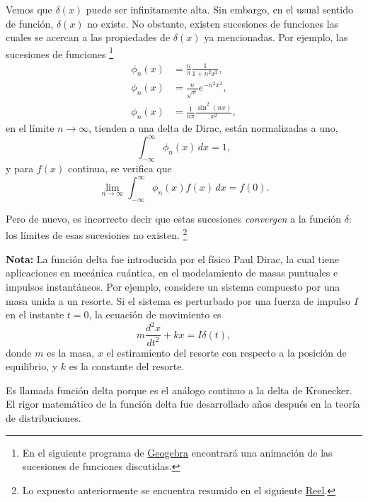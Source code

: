 Vemos que $\delta(x)$ puede ser infinitamente alta. Sin embargo, en el usual sentido de función, $\delta(x)$ no existe. No obstante, existen sucesiones de funciones las cuales se acercan a las propiedades de $\delta(x)$ ya mencionadas. Por ejemplo, las sucesiones de funciones \footnote{En el siguiente programa de \href{https://www.geogebra.org/m/snk6hnus}{Geogebra} encontrará una animación de las sucesiones de funciones discutidas.}
\begin{align}
    \phi_n(x) &= \frac{n}{\pi} \frac{1}{1+n^2 x^2}, \\
     \phi_n(x) &= \frac{n}{\sqrt{\pi}} e^{-n^2x^2},\\
      \phi_n(x) &=  \frac{1}{n\pi} \frac{\sin^2(nx)}{x^2},
\end{align}
en el límite $n \to \infty$, tienden a una delta de Dirac, están normalizadas a uno, 
\begin{equation}
  \int_{-\infty}^{\infty} \phi_n(x) \,dx = 1,  
\end{equation}
y para $f(x)$ continua, se verifica que 
\begin{equation}
  \lim_{n \to \infty} \int_{-\infty}^{\infty} \phi_n(x) f(x) \,dx = f(0).  
\end{equation}

Pero de nuevo, es incorrecto decir que estas sucesiones \textit{convergen} a la función $\delta$: los límites de esas sucesiones no existen. \footnote{Lo expuesto anteriormente se encuentra resumido en el siguiente \href{https://www.instagram.com/reel/C0mIjYotIOZ/?utm_source=ig_web_copy_link&igsh=MzRlODBiNWFlZA==}{Reel}.}

\begin{shaded}
\vspace{0.1cm}
\textbf{Nota:} La función delta fue introducida por el físico Paul Dirac, la cual tiene aplicaciones en mecánica cuántica, en el modelamiento de masas puntuales e impulsos instantáneos. Por ejemplo, considere un sistema compuesto por una masa unida a un resorte. Si el sistema es perturbado por una fuerza de impulso $I$ en el instante $t = 0$, la ecuación de movimiento es
\begin{equation}
    m \frac{d^2 x}{dt^2} + k x = I\delta(t),
\end{equation}
donde $m$ es la masa, $x$ el estiramiento del resorte con respecto a la posición de equilibrio, y $k$ es la constante del resorte.

Es llamada función delta porque es el análogo continuo a la delta de Kronecker. El rigor matemático de la función delta fue desarrollado años después en la teoría de distribuciones.
\vspace{0.2cm}
\end{shaded}

